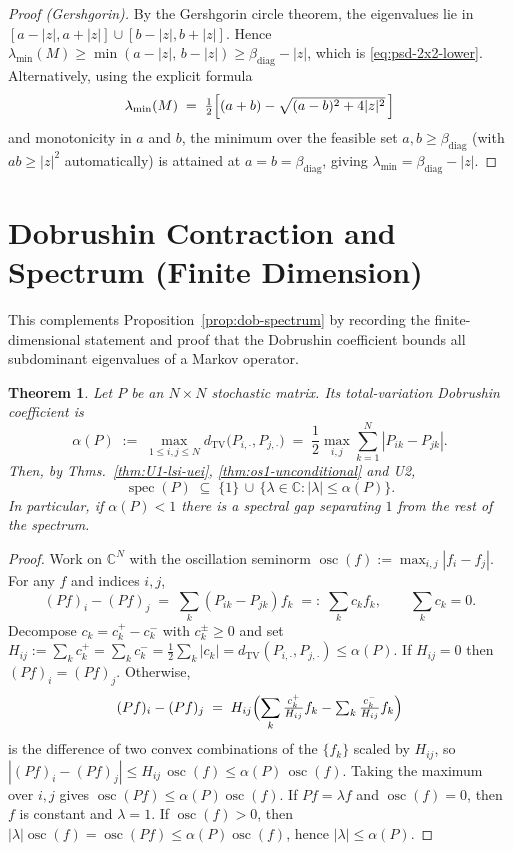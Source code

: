 \documentclass[11pt]{amsart}
\theoremstyle{plain}
\newtheorem{theorem}{Theorem}[section]
\theoremstyle{definition}
\theoremstyle{remark}
\renewcommand{\tfrac}[2]{\textstyle\frac{#1}{#2}}
\begin{document}
\begin{proof}[Proof (Gershgorin)]
By the Gershgorin circle theorem, the eigenvalues lie in $[a-|z|,a+|z|]\cup[b-|z|,b+|z|]$. Hence $\lambda_{\min}(M)\ge \min(a-|z|,\,b-|z|)\ge \beta_{\mathrm{diag}}-|z|$, which is \eqref{eq:psd-2x2-lower}. Alternatively, using the explicit formula
\[
  \lambda_{\min}(M)\;=\;\tfrac12\Bigl[(a+b)-\sqrt{(a-b)^2+4|z|^2}\,\Bigr]
\]
and monotonicity in $a$ and $b$, the minimum over the feasible set $a,b\ge\beta_{\mathrm{diag}}$ (with $ab\ge |z|^2$ automatically) is attained at $a=b=\beta_{\mathrm{diag}}$, giving $\lambda_{\min}=\beta_{\mathrm{diag}}-|z|$.
\end{proof}
\section{Dobrushin Contraction and Spectrum (Finite Dimension)}
This complements Proposition~\ref{prop:dob-spectrum} by recording the finite-dimensional statement and proof that the Dobrushin coefficient bounds all subdominant eigenvalues of a Markov operator.
\begin{theorem}
Let $P$ be an $N\times N$ stochastic matrix. Its total-variation Dobrushin coefficient is
\[
  \alpha(P)\;:=\;\max_{1\le i,j\le N} d_{\mathrm{TV}}\bigl(P_{i,\cdot},P_{j,\cdot}\bigr)
  \;=\;\tfrac12\max_{i,j}\sum_{k=1}^N |P_{ik}-P_{jk}|.
\]
Then, by Thms.~\ref{thm:U1-lsi-uei}, \ref{thm:os1-unconditional} and U2,
\[
  \operatorname{spec}(P)\;\subseteq\;\{1\}\,\cup\,\{\lambda\in\mathbb{C}: |\lambda|\le \alpha(P)\}.
\]
In particular, if $\alpha(P)<1$ there is a spectral gap separating $1$ from the rest of the spectrum.
\end{theorem}
\begin{proof}
Work on $\mathbb{C}^N$ with the oscillation seminorm $\operatorname{osc}(f):=\max_{i,j}|f_i-f_j|$. For any $f$ and indices $i,j$,
\[
  (Pf)_i-(Pf)_j\;=\;\sum_k (P_{ik}-P_{jk}) f_k\;=:\;\sum_k c_k f_k,\qquad \sum_k c_k=0.
\]
Decompose $c_k=c_k^+-c_k^-$ with $c_k^\pm\ge 0$ and set $H_{ij}:=\sum_k c_k^+=\sum_k c_k^- = \tfrac12\sum_k |c_k| = d_{\mathrm{TV}}(P_{i,\cdot},P_{j,\cdot})\le \alpha(P)$. If $H_{ij}=0$ then $(Pf)_i=(Pf)_j$. Otherwise,
\[
  (Pf)_i-(Pf)_j\;=\;H_{ij}\Bigl(\sum_k \tfrac{c_k^+}{H_{ij}} f_k - \sum_k \tfrac{c_k^-}{H_{ij}} f_k\Bigr)
\]
is the difference of two convex combinations of the $\{f_k\}$ scaled by $H_{ij}$, so $|(Pf)_i-(Pf)_j|\le H_{ij}\,\operatorname{osc}(f)\le \alpha(P)\,\operatorname{osc}(f)$. Taking the maximum over $i,j$ gives $\operatorname{osc}(Pf)\le \alpha(P)\operatorname{osc}(f)$. If $Pf=\lambda f$ and $\operatorname{osc}(f)=0$, then $f$ is constant and $\lambda=1$. If $\operatorname{osc}(f)>0$, then $|\lambda|\operatorname{osc}(f)=\operatorname{osc}(Pf)\le \alpha(P)\operatorname{osc}(f)$, hence $|\lambda|\le \alpha(P)$.
\end{proof}
\end{document}
